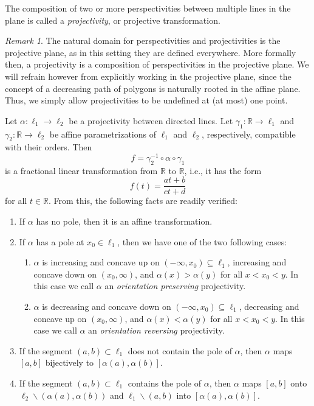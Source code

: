 \documentclass[11pt]{amsart}
\theoremstyle{remark}
\newtheorem{remark}[theorem]{Remark}
\numberwithin{equation}{section}
\newcommand{\R}{\mathbb{R}}
\begin{document}
The composition of two or more perspectivities between multiple lines in the plane is called a \emph{projectivity}, or projective transformation. 

\begin{remark} 
The natural domain for perspectivities and projectivities is the projective plane, as in this setting they are defined everywhere. 
More formally then, a projectivity is a composition of perspectivities in the projective plane. We will refrain however from explicitly working in the projective plane, since the concept of a decreasing path of polygons is naturally rooted in the affine plane.  Thus, we simply allow projectivities to be undefined at (at most) one point. 
\end{remark}

Let $\alpha\colon\ell_1\to\ell_2$ be a projectivity between directed lines. Let $\gamma_1\colon \R\to \ell_1$ and $\gamma_2\colon \R\to \ell_2$ be affine parametrizations of $\ell_1$ and $\ell_2$, respectively, compatible with their orders. Then 
\[
f=\gamma_2^{-1}\circ \alpha\circ\gamma_1
\]
is a fractional linear transformation from $\R$ to $\R$, i.e., it has the form 
\[
f(t)=\frac{at+b}{ct+d}
\]
for all $t\in \R$.  From this, the following facts are readily verified:
\begin{enumerate}
\item 
If $\alpha$ has no pole, then it is an affine transformation.

\item 
If $\alpha$ has a pole at $x_0\in\ell_1$, then we have one of the two following cases:
\begin{enumerate}
\item[(a)]
$\alpha$ is increasing and concave up on
$(-\infty,x_0)\subseteq \ell_1$, increasing and concave down on $(x_0,\infty)$, and
$\alpha(x)>\alpha(y)$ for all $x<x_0<y$. In this case we call $\alpha$ an \emph{orientation 
preserving} projectivity. 
\item[(b)]
$\alpha$ is decreasing and concave down on $(-\infty,x_0)\subseteq \ell_1$, decreasing and concave up on $(x_0,\infty)$, and $\alpha(x)<\alpha(y)$ for all $x<x_0<y$.  In this case we call $\alpha$ an \emph{orientation reversing} projectivity. 
\end{enumerate}
\item
If the segment $(a,b)\subset  \ell_1$ does not contain the pole of $\alpha$, then $\alpha$ maps $[a,b]$
bijectively to $[\alpha(a),\alpha(b)]$.

\item
If the segment $(a,b)\subset  \ell_1$ contains the pole of $\alpha$, then $\alpha$ maps $[a,b]$ onto $\ell_2\backslash (\alpha(a),\alpha(b))$ and $\ell_1\backslash (a,b)$  into 
$[\alpha(a),\alpha(b)]$.
\end{enumerate}
\end{document}
